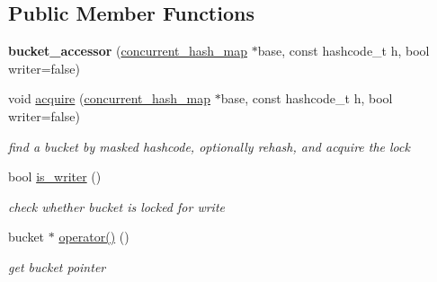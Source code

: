 \subsection*{Public Member Functions}
\begin{DoxyCompactItemize}
\item 
\hypertarget{classtbb_1_1interface5_1_1concurrent__hash__map_1_1bucket__accessor_a363fdc2cb5049f533b7a0bf365ed8e07}{}{\bfseries bucket\+\_\+accessor} (\hyperlink{classtbb_1_1interface5_1_1concurrent__hash__map}{concurrent\+\_\+hash\+\_\+map} $\ast$base, const hashcode\+\_\+t h, bool writer=false)\label{classtbb_1_1interface5_1_1concurrent__hash__map_1_1bucket__accessor_a363fdc2cb5049f533b7a0bf365ed8e07}

\item 
\hypertarget{classtbb_1_1interface5_1_1concurrent__hash__map_1_1bucket__accessor_a31a5ea9a4ec5a497513b9ad10dcb6f8d}{}void \hyperlink{classtbb_1_1interface5_1_1concurrent__hash__map_1_1bucket__accessor_a31a5ea9a4ec5a497513b9ad10dcb6f8d}{acquire} (\hyperlink{classtbb_1_1interface5_1_1concurrent__hash__map}{concurrent\+\_\+hash\+\_\+map} $\ast$base, const hashcode\+\_\+t h, bool writer=false)\label{classtbb_1_1interface5_1_1concurrent__hash__map_1_1bucket__accessor_a31a5ea9a4ec5a497513b9ad10dcb6f8d}

\begin{DoxyCompactList}\small\item\em find a bucket by masked hashcode, optionally rehash, and acquire the lock \end{DoxyCompactList}\item 
\hypertarget{classtbb_1_1interface5_1_1concurrent__hash__map_1_1bucket__accessor_af25396304aa698bad0249263c7cccc5e}{}bool \hyperlink{classtbb_1_1interface5_1_1concurrent__hash__map_1_1bucket__accessor_af25396304aa698bad0249263c7cccc5e}{is\+\_\+writer} ()\label{classtbb_1_1interface5_1_1concurrent__hash__map_1_1bucket__accessor_af25396304aa698bad0249263c7cccc5e}

\begin{DoxyCompactList}\small\item\em check whether bucket is locked for write \end{DoxyCompactList}\item 
\hypertarget{classtbb_1_1interface5_1_1concurrent__hash__map_1_1bucket__accessor_a95ded8ec5066d3b733d47969a8ad0e1d}{}bucket $\ast$ \hyperlink{classtbb_1_1interface5_1_1concurrent__hash__map_1_1bucket__accessor_a95ded8ec5066d3b733d47969a8ad0e1d}{operator()} ()\label{classtbb_1_1interface5_1_1concurrent__hash__map_1_1bucket__accessor_a95ded8ec5066d3b733d47969a8ad0e1d}

\begin{DoxyCompactList}\small\item\em get bucket pointer \end{DoxyCompactList}\end{DoxyCompactItemize}


